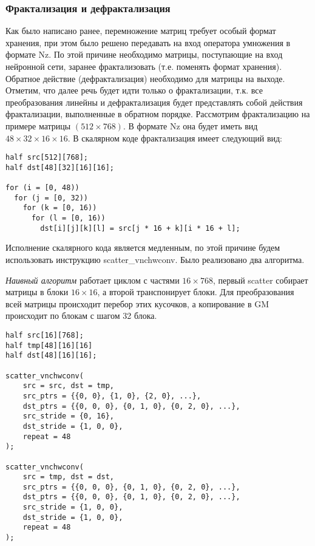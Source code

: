 \subsubsection{Фрактализация и дефрактализация}

Как было написано ранее, перемножение матриц требует особый формат хранения,
при этом было решено передавать на вход оператора умножения в формате Nz.
По этой причине необходимо матрицы, поступающие на вход нейронной сети, заранее
фрактализовать (т.е. поменять формат хранения). Обратное действие
(дефрактализация) необходимо для матрицы на выходе. Отметим, что далее речь
будет идти только о фрактализации, т.к. все преобразования линейны и
дефрактализация будет представлять собой действия фрактализации, выполненные в
обратном порядке. Рассмотрим фрактализацию на примере матрицы
$(512 \times 768)$. В формате Nz она будет иметь вид
$48 \times 32 \times 16 \times 16$. В скалярном коде фрактализация имеет
следующий вид:

\begin{lstlisting}
half src[512][768];
half dst[48][32][16][16];

for (i = [0, 48))
  for (j = [0, 32))
    for (k = [0, 16))
      for (l = [0, 16))
        dst[i][j][k][l] = src[j * 16 + k][i * 16 + l];
\end{lstlisting}

Исполнение скалярного кода является медленным, по этой причине будем
использовать инструкцию scatter\_vnchwconv. Было реализовано два алгоритма.

\textit{Наивный алгоритм} работает циклом с частями $16 \times 768$, первый
scatter собирает матрицы в блоки $16 \times 16$, а второй транспонирует
блоки. Для преобразования всей матрицы происходит перебор этих кусочков,
а копирование в GM происходит по блокам с шагом 32 блока.

\begin{lstlisting}
half src[16][768];
half tmp[48][16][16]
half dst[48][16][16];

scatter_vnchwconv(
    src = src, dst = tmp,
    src_ptrs = {{0, 0}, {1, 0}, {2, 0}, ...},
    dst_ptrs = {{0, 0, 0}, {0, 1, 0}, {0, 2, 0}, ...},
    src_stride = {0, 16},
    dst_stride = {1, 0, 0},
    repeat = 48
);

scatter_vnchwconv(
    src = tmp, dst = dst,
    src_ptrs = {{0, 0, 0}, {0, 1, 0}, {0, 2, 0}, ...},
    dst_ptrs = {{0, 0, 0}, {0, 1, 0}, {0, 2, 0}, ...},
    src_stride = {1, 0, 0},
    dst_stride = {1, 0, 0},
    repeat = 48
);
\end{lstlisting}

